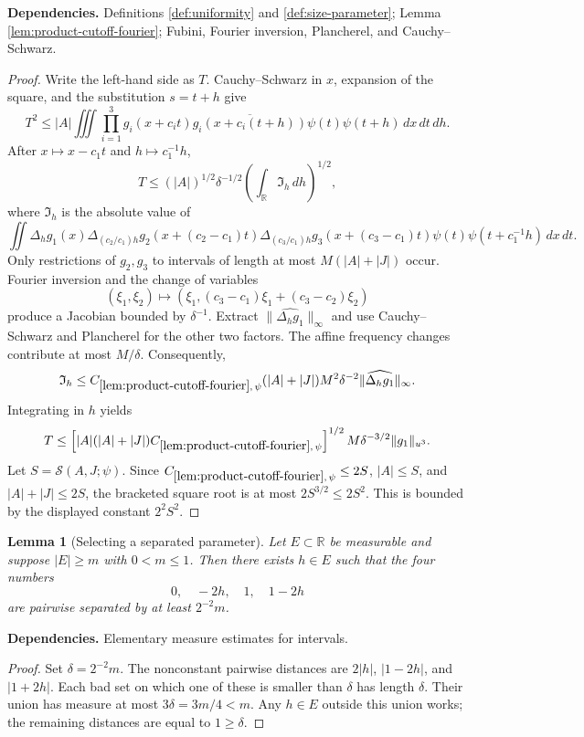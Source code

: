 \documentclass[11pt]{article}
\newtheorem{lemma}[lemma]{Lemma}
\theoremstyle{definition}
\theoremstyle{remark}
\newcommand{\R}{\mathbb R}
\newcommand{\1}{\mathbf 1}
\newcommand{\FT}[1]{\widehat{#1}}
\newcommand{\dd}{\,d}
\newcommand{\uNorm}[2]{\lVert #1\rVert_{u^{#2}}}
\newcommand{\lpNorm}[2]{\lVert #1\rVert_{#2}}
\newcommand{\uses}[1]{\par\smallskip\noindent\textbf{Dependencies.} #1\par\smallskip}
\newcommand{\Ssize}[2]{\mathcal S\!\left(#1;#2\right)}
\begin{document}
\uses{Definitions \ref{def:uniformity} and \ref{def:size-parameter}; Lemma \ref{lem:product-cutoff-fourier}; Fubini, Fourier inversion, Plancherel, and Cauchy--Schwarz.}

\begin{proof}
Write the left-hand side as $T$.  Cauchy--Schwarz in $x$, expansion of the square, and the substitution $s=t+h$ give
\[
T^2
\leq
\lvert A\rvert
\iiint
\prod_{i=1}^3g_i(x+c_it)\overline{g_i(x+c_i(t+h))}
\psi(t)\psi(t+h)
\dd x\dd t\dd h.
\]
After $x\mapsto x-c_1t$ and $h\mapsto c_1^{-1}h$,
\[
T
\leq
(\lvert A\rvert)^{1/2}\delta^{-1/2}
\left(\int_\R\mathfrak I_h\dd h\right)^{1/2},
\]
where $\mathfrak I_h$ is the absolute value of
\[
\iint
\Delta_hg_1(x)
\Delta_{(c_2/c_1)h}g_2(x+(c_2-c_1)t)
\Delta_{(c_3/c_1)h}g_3(x+(c_3-c_1)t)
\psi(t)\psi(t+c_1^{-1}h)
\dd x\dd t.
\]
Only restrictions of $g_2,g_3$ to intervals of length at most
$M(\lvert A\rvert+\lvert J\rvert)$ occur.  Fourier inversion and the change of variables
\[
(\xi_1,\xi_2)
\mapsto
(\xi_1,(c_3-c_1)\xi_1+(c_3-c_2)\xi_2)
\]
produce a Jacobian bounded by $\delta^{-1}$.  Extract
$\lpNorm{\FT{\Delta_hg_1}}\infty$ and use Cauchy--Schwarz and Plancherel for the other two factors.  The affine frequency changes contribute at most $M/\delta$.  Consequently,
\[
\mathfrak I_h
\leq
C_{\ref{lem:product-cutoff-fourier},\,\psi}
(\lvert A\rvert+\lvert J\rvert)M^2\delta^{-2}
\lpNorm{\FT{\Delta_hg_1}}\infty.
\]
Integrating in $h$ yields
\[
T
\leq
\left[
\lvert A\rvert(\lvert A\rvert+\lvert J\rvert)
C_{\ref{lem:product-cutoff-fourier},\,\psi}
\right]^{1/2}
M\delta^{-3/2}\uNorm{g_1}3.
\]
Let $S=\Ssize{A,J}{\psi}$.  Since
$C_{\ref{lem:product-cutoff-fourier},\,\psi}\leq2S$,
$\lvert A\rvert\leq S$, and $\lvert A\rvert+\lvert J\rvert\leq2S$, the bracketed square root is at most $2S^{3/2}\leq2S^2$.  This is bounded by the displayed constant $2^2S^2$.
\end{proof}

\begin{lemma}[Selecting a separated parameter]\label{lem:separation-selection}
Let $E\subset\R$ be measurable and suppose $|E|\geq m$ with $0<m\leq1$.  Then there exists $h\in E$ such that the four numbers
\[
0,\quad -2h,\quad 1,\quad 1-2h
\]
are pairwise separated by at least $2^{-2}m$.
\end{lemma}

\uses{Elementary measure estimates for intervals.}

\begin{proof}
Set $\delta=2^{-2}m$.  The nonconstant pairwise distances are
$2|h|$, $|1-2h|$, and $|1+2h|$.  Each bad set on which one of these is smaller than $\delta$ has length $\delta$.  Their union has measure at most $3\delta=3m/4<m$.  Any $h\in E$ outside this union works; the remaining distances are equal to $1\geq\delta$.
\end{proof}
\end{document}
